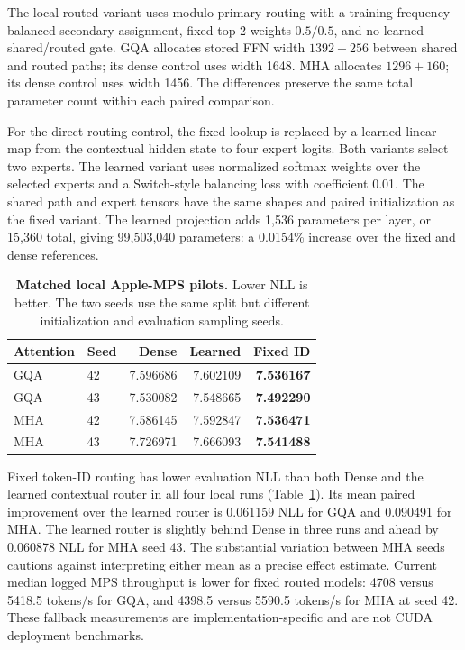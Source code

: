 \documentclass[10pt,twocolumn]{article}
\begin{document}
The local routed variant uses modulo-primary routing with a
training-frequency-balanced secondary assignment, fixed top-2 weights
$0.5/0.5$, and no learned shared/routed gate. GQA allocates stored FFN width
$1392+256$ between shared and routed paths; its dense control uses width 1648.
MHA allocates $1296+160$; its dense control uses width 1456. The differences
preserve the same total parameter count within each paired comparison.

For the direct routing control, the fixed lookup is replaced by a learned
linear map from the contextual hidden state to four expert logits. Both
variants select two experts. The learned variant uses normalized softmax
weights over the selected experts and a Switch-style balancing loss with
coefficient 0.01. The shared path and expert tensors have the same shapes and
paired initialization as the fixed variant. The learned projection adds 1,536
parameters per layer, or 15,360 total, giving 99,503,040 parameters: a 0.0154\%
increase over the fixed and dense references.

\begin{table}[t]
\centering
\footnotesize
\setlength{\tabcolsep}{3pt}
\caption{\textbf{Matched local Apple-MPS pilots.} Lower NLL is better.
The two seeds use the same split but different initialization and evaluation
sampling seeds.}
\label{tab:mps}
\begin{tabular}{llrrr}
\toprule
Attention & Seed & Dense & Learned & Fixed ID \\
\midrule
GQA & 42 & 7.596686 & 7.602109 & \textbf{7.536167} \\
GQA & 43 & 7.530082 & 7.548665 & \textbf{7.492290} \\
MHA & 42 & 7.586145 & 7.592847 & \textbf{7.536471} \\
MHA & 43 & 7.726971 & 7.666093 & \textbf{7.541488} \\
\bottomrule
\end{tabular}
\end{table}

Fixed token-ID routing has lower evaluation NLL than both Dense and the learned
contextual router in all four local runs (Table~\ref{tab:mps}). Its mean paired
improvement over the learned router is 0.061159 NLL for GQA and 0.090491 for
MHA. The learned router is slightly behind Dense in three runs and ahead by
0.060878 NLL for MHA seed 43. The substantial variation between MHA seeds
cautions against interpreting either mean as a precise effect estimate.
Current median logged MPS throughput is lower for fixed routed models: 4708
versus 5418.5 tokens/s for GQA, and 4398.5 versus 5590.5 tokens/s for MHA at
seed 42. These fallback measurements are implementation-specific and are not
CUDA deployment benchmarks.
\end{document}
